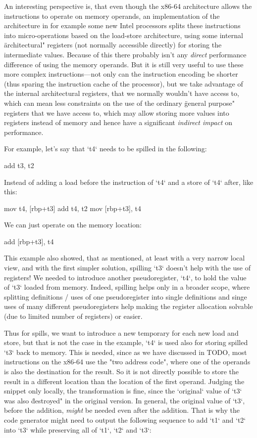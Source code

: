 An interesting perspective is, that even though the x86-64 architecture allows
the instructions to operate on memory operands, an implementation of the
architecture in for example some new Intel processors splits these instructions
into micro-operations based on the load-store architecture, using some internal
\"architectural" registers (not normally accessible directly) for storing the
intermediate values. Because of this there probably isn't any {\em direct}
performance difference of using the memory operands. But it is still very useful
to use these more complex instructions---not only can the instruction encoding
be shorter (thus sparing the instruction cache of the processor), but we take
advantage of the internal architectural registers, that we normally wouldn't
have access to, which can mean less constraints on the use of the ordinary
\"general purpose" registers that we have access to, which may allow storing
more values into registers instead of memory and hence have a significant {\em
indirect impact} on performance.

For example, let's say that `t4` needs to be spilled in the following:

\begtt
add t3, t2
\endtt

Instead of adding a load before the instruction of `t4` and a store of `t4`
after, like this:

\begtt
mov t4, [rbp+t3]
add t4, t2
mov [rbp+t3], t4
\endtt

We can just operate on the memory location:

\begtt
add [rbp+t3], t4
\endtt

This example also showed, that as mentioned, at least with a very narrow local
view, and with the first simpler solution, spilling `t3` doesn't help with the
use of registers! We needed to introduce another pseudoregister, `t4`, to hold
the value of `t3` loaded from memory. Indeed, spilling helps only in a broader
scope, where splitting definitions / uses of one pseudoregister into single
definitions and singe uses of many different pseudoregisters help making the
register allocation solvable (due to limited number of registers) or easier.

Thus for spills, we want to introduce a new temporary for each new load and
store, but that is not the case in the example, `t4` is used also for storing
spilled `t3` back to memory. This is needed, since as we have discussed in TODO,
most instructions on the x86-64 use the "two address code", where one of the
operands is also the destination for the result. So it is not directly possible
to store the result in a different location than the location of the first
operand. Judging the snippet only locally, the transformation is fine, since the
`original` value of `t3` was also \"destroyed" in the original version. In
general, the original value of `t3`, before the addition, {\em might} be needed
even after the addition. That is why the code generator might need to output the
following sequence to add `t1` and `t2` into `t3` while preserving all of `t1`,
`t2` and `t3`:

